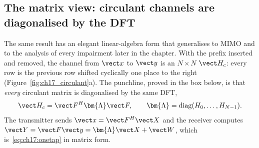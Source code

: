 \subsection{The matrix view: circulant channels are diagonalised by the DFT}

The same result has an elegant linear-algebra form that generalises to MIMO and to the analysis of
every impairment later in the chapter. With the prefix inserted and removed, the channel from
$\vect x$ to $\vect y$ is an $N\times N$  $\vect H_c$: every row is the
previous row shifted cyclically one place to the right (Figure~\ref{fig:ch17_circulant}a). The
punchline, proved in the box below, is that \emph{every} circulant matrix is diagonalised by the
same DFT,
\begin{equation}
\vect H_c=\vect F^H\bm{\Lambda}\vect F,\qquad \bm{\Lambda}=\operatorname{diag}(H_0,\dots,H_{N-1}).
\label{eq:ch17:eig}
\end{equation}
The transmitter sends $\vect x=\vect F^H\vect X$ and the receiver computes $\vect Y=\vect F\vect y=
\bm{\Lambda}\vect X+\vect W$, which is~\eqref{eq:ch17:onetap} in matrix form.


